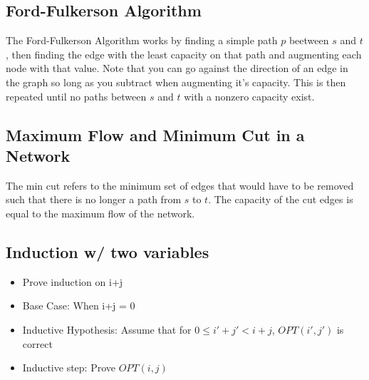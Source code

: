 \documentclass{article}
\begin{document}
\subsection{Ford-Fulkerson Algorithm}
The Ford-Fulkerson Algorithm works by finding a simple path $p$ beetween $s$ and $t$, then finding
the edge with the least capacity on that path and augmenting each node with that value.
Note that you can go against the direction of an edge in the graph so long as you subtract when augmenting
it's capacity.
This is then repeated until no paths between $s$ and $t$ with a nonzero capacity exist. 

\subsection{Maximum Flow and Minimum Cut in a Network}
The min cut refers to the minimum set of edges that would have to be removed such that there is no longer
a path from $s$ to $t$. The capacity of the cut edges is equal to the maximum flow of the network.

\subsection{Induction w/ two variables}
\begin{itemize}
    \item Prove induction on i+j
    \item Base Case: When i+j = 0
    \item Inductive Hypothesis: Assume that for $0 \le i' + j' < i+j$, $OPT(i', j')$ is correct
    \item Inductive step: Prove  $OPT(i, j)$
\end{itemize}
\end{document}
